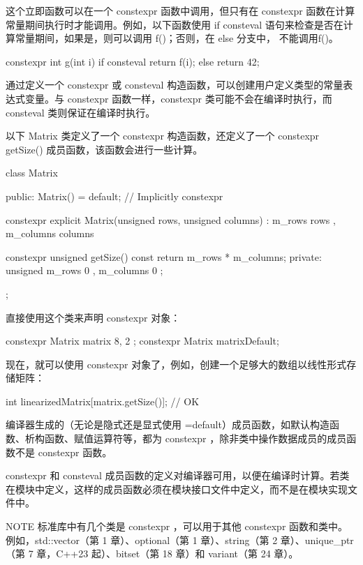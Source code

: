 
这个立即函数可以在一个 constexpr 函数中调用，但只有在 constexpr 函数在计算常量期间执行时才能调用。例如，以下函数使用 if consteval 语句来检查是否在计算常量期间，如果是，则可以调用 f()；否则，在 else 分支中， 不能调用f()。

\begin{cpp}
constexpr int g(int i)
{
    if consteval { return f(i); }
    else { return 42; }
}
\end{cpp}


通过定义一个 constexpr 或 consteval 构造函数，可以创建用户定义类型的常量表达式变量。与 constexpr 函数一样，constexpr 类可能不会在编译时执行，而 consteval 类则保证在编译时执行。

以下 Matrix 类定义了一个 constexpr 构造函数，还定义了一个 constexpr getSize() 成员函数，该函数会进行一些计算。

\begin{cpp}
class Matrix
{
    public:
        Matrix() = default; // Implicitly constexpr

        constexpr explicit Matrix(unsigned rows, unsigned columns)
            : m_rows { rows }, m_columns { columns } { }

        constexpr unsigned getSize() const { return m_rows * m_columns; }
    private:
        unsigned m_rows { 0 }, m_columns { 0 };
};
\end{cpp}

直接使用这个类来声明 constexpr 对象：

\begin{cpp}
constexpr Matrix matrix { 8, 2 };
constexpr Matrix matrixDefault;
\end{cpp}

现在，就可以使用 constexpr 对象了，例如，创建一个足够大的数组以线性形式存储矩阵：

\begin{cpp}
int linearizedMatrix[matrix.getSize()]; // OK
\end{cpp}

编译器生成的（无论是隐式还是显式使用 =default）成员函数，如默认构造函数、析构函数、赋值运算符等，都为 constexpr ，除非类中操作数据成员的成员函数不是 constexpr 函数。

constexpr 和 consteval 成员函数的定义对编译器可用，以便在编译时计算。若类在模块中定义，这样的成员函数必须在模块接口文件中定义，而不是在模块实现文件中。

\begin{myNotic}{NOTE}
标准库中有几个类是 constexpr ，可以用于其他 constexpr 函数和类中。例如，std::vector（第 1 章）、optional（第 1 章）、string（第 2 章）、unique\_ptr（第 7 章，C++23 起）、bitset（第 18 章）和 variant（第 24 章）。
\end{myNotic}











